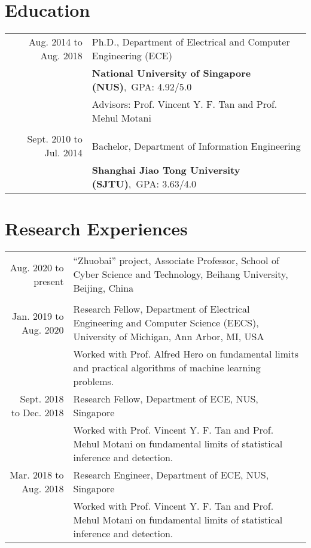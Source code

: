 \documentclass[12pt]{article} %
\begin{document}
\section{Education}
\begin{tabular}{rp{11cm}}	
Aug. 2014 to Aug. 2018 & Ph.D., Department of Electrical and Computer Engineering (ECE) \\
 & \textbf{National University of Singapore (NUS)},~GPA: 4.92/5.0\\
 &Advisors: Prof. Vincent Y. F. Tan and Prof. Mehul Motani\\
 \\
Sept. 2010 to Jul. 2014 & Bachelor, Department of Information Engineering \\
& \textbf{Shanghai Jiao Tong University (SJTU)},~GPA: 3.63/4.0\\
\end{tabular}


\section{Research Experiences}
\begin{tabular}{rp{11cm}}
Aug. 2020 to present& ``Zhuobai'' project, Associate Professor, School of Cyber Science and Technology, Beihang University, Beijing, China\\	
\\
Jan. 2019 to Aug. 2020 & Research Fellow, Department of Electrical Engineering and Computer Science (EECS), University of Michigan, Ann Arbor, MI, USA\\
\vspace{.1in}
&Worked with Prof. Alfred Hero on fundamental limits and practical algorithms of machine learning problems.\\
Sept. 2018 to Dec. 2018 & Research Fellow, Department of ECE, NUS, Singapore\\
\vspace{.1in}
 & Worked with Prof. Vincent Y. F. Tan and Prof. Mehul Motani on fundamental limits of statistical inference and detection.\\
Mar. 2018 to Aug. 2018 & Research Engineer, Department of ECE, NUS, Singapore\\
\vspace{.1in}
 & Worked with Prof. Vincent Y. F. Tan and Prof. Mehul Motani on fundamental limits of statistical inference and detection.
\end{tabular}
\end{document}
